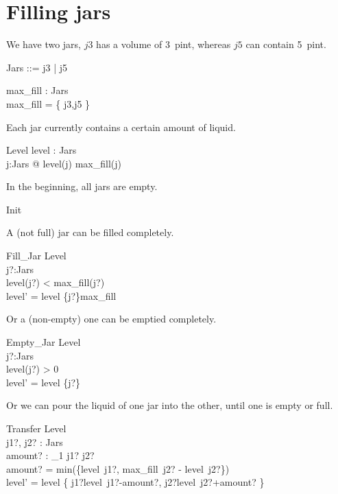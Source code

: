 \documentclass{article}
\begin{document}
\section*{Filling jars}
We have two jars, $j3$ has a volume of 3~pint, whereas $j5$ can contain 5~pint.
\begin{zed}
  Jars ::= j3 | j5
\end{zed}
\begin{axdef}
  max\_fill : Jars \fun \nat \\
  \where
  max\_fill = \{ j3,j5 \} \\
\end{axdef}
Each jar currently contains a certain amount of liquid.
\begin{schema}{Level}
  level : Jars \fun \nat \\
  \where
  \forall j:Jars @ level(j) \leq max\_fill(j)
\end{schema}
In the beginning, all jars are empty.
\begin{zed}
  Init  \\
\end{zed}
A (not full) jar can be filled completely.
\begin{schema}{Fill\_Jar}
  \Delta Level \\
  j?:Jars \\
  \where
  level(j?) < max\_fill(j?) \\
  level' = level \oplus \{j?\}\dres max\_fill \\
\end{schema}
Or a (non-empty) one can be emptied completely.
\begin{schema}{Empty\_Jar}
  \Delta Level \\
  j?:Jars \\
  \where
  level(j?) > 0 \\
  level' = level \oplus \{j?\} \\
\end{schema}
Or we can pour the liquid of one jar into the other, until one is empty or full.
\begin{schema}{Transfer}
  \Delta Level \\
  j1?, j2? : Jars \\
  amount? : \nat_1
  \where
  j1? \neq j2? \\
  amount? = min(\{level~j1?, max\_fill~j2? - level~j2?\}) \\
  level' = level \oplus \{ j1?\mapsto level~j1?-amount?, j2?\mapsto level~j2?+amount? \}
\end{schema}
\end{document}
